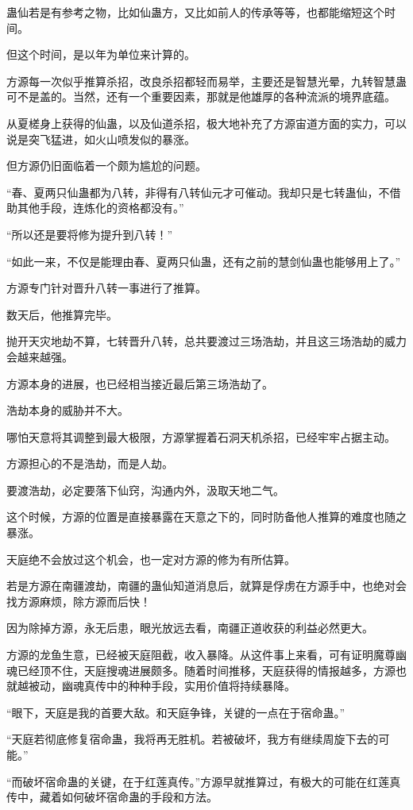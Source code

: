 \begin{this_body}
蛊仙若是有参考之物，比如仙蛊方，又比如前人的传承等等，也都能缩短这个时间。

但这个时间，是以年为单位来计算的。

方源每一次似乎推算杀招，改良杀招都轻而易举，主要还是智慧光晕，九转智慧蛊可不是盖的。当然，还有一个重要因素，那就是他雄厚的各种流派的境界底蕴。

从夏槎身上获得的仙蛊，以及仙道杀招，极大地补充了方源宙道方面的实力，可以说是突飞猛进，如火山喷发似的暴涨。

但方源仍旧面临着一个颇为尴尬的问题。

“春、夏两只仙蛊都为八转，非得有八转仙元才可催动。我却只是七转蛊仙，不借助其他手段，连炼化的资格都没有。”

“所以还是要将修为提升到八转！”

“如此一来，不仅是能理由春、夏两只仙蛊，还有之前的慧剑仙蛊也能够用上了。”

方源专门针对晋升八转一事进行了推算。

数天后，他推算完毕。

抛开天灾地劫不算，七转晋升八转，总共要渡过三场浩劫，并且这三场浩劫的威力会越来越强。

方源本身的进展，也已经相当接近最后第三场浩劫了。

浩劫本身的威胁并不大。

哪怕天意将其调整到最大极限，方源掌握着石洞天机杀招，已经牢牢占据主动。

方源担心的不是浩劫，而是人劫。

要渡浩劫，必定要落下仙窍，沟通内外，汲取天地二气。

这个时候，方源的位置是直接暴露在天意之下的，同时防备他人推算的难度也随之暴涨。

天庭绝不会放过这个机会，也一定对方源的修为有所估算。

若是方源在南疆渡劫，南疆的蛊仙知道消息后，就算是俘虏在方源手中，也绝对会找方源麻烦，除方源而后快！

因为除掉方源，永无后患，眼光放远去看，南疆正道收获的利益必然更大。

方源的龙鱼生意，已经被天庭阻截，收入暴降。从这件事上来看，可有证明魔尊幽魂已经顶不住，天庭搜魂进展颇多。随着时间推移，天庭获得的情报越多，方源也就越被动，幽魂真传中的种种手段，实用价值将持续暴降。

“眼下，天庭是我的首要大敌。和天庭争锋，关键的一点在于宿命蛊。”

“天庭若彻底修复宿命蛊，我将再无胜机。若被破坏，我方有继续周旋下去的可能。”

“而破坏宿命蛊的关键，在于红莲真传。”方源早就推算过，有极大的可能在红莲真传中，藏着如何破坏宿命蛊的手段和方法。


\end{this_body}
